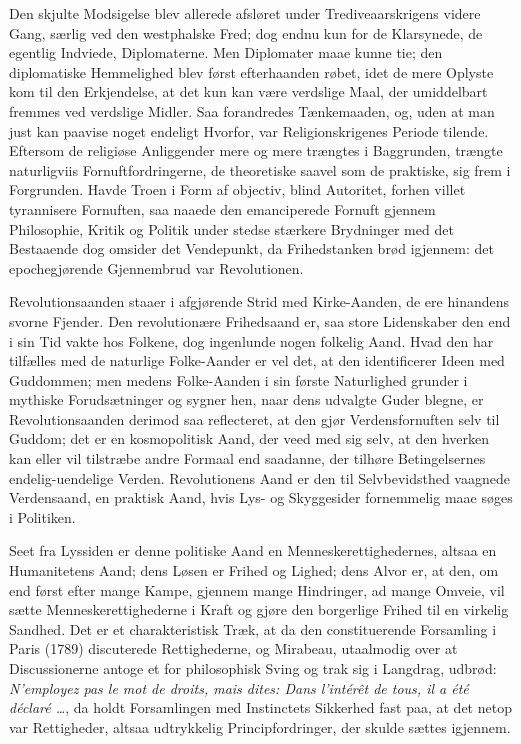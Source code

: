 \documentclass[12pt]{book}
\newcommand{\opage}[1]{\marginnote{\footnotesize\textit{[#1]}}}
\begin{document}
Den skjulte Modsigelse blev allerede afsløret under
Trediveaarskrigens videre Gang, særlig ved den westphalske
Fred; dog endnu kun for de Klarsynede, de
egentlig Indviede, Diplomaterne. Men Diplomater maae
kunne tie; den diplomatiske Hemmelighed blev først
efterhaanden røbet, idet de mere Oplyste kom til den
Erkjendelse, at det kun kan være verdslige Maal, der
umiddelbart fremmes ved verdslige Midler. Saa forandredes
Tænkemaaden, og, uden at man just kan paavise
noget endeligt Hvorfor, var Religionskrigenes Periode tilende.
Eftersom de religiøse Anliggender mere og mere
trængtes i Baggrunden, trængte naturligviis Fornuftfordringerne,
de theoretiske saavel som de praktiske, sig
frem i Forgrunden. Havde Troen i Form af objectiv,
blind Autoritet, forhen villet tyrannisere Fornuften, saa
naaede den emanciperede Fornuft gjennem Philosophie,
\opage{34}\setcounter{footnote}{0}%
Kritik og Politik under stedse stærkere Brydninger med
det Bestaaende dog omsider det Vendepunkt, da Frihedstanken
brød igjennem: det epochegjørende Gjennembrud
var Revolutionen.

Revolutionsaanden staaer i afgjørende Strid med
Kirke-Aanden, de ere hinandens svorne Fjender. Den
revolutionære Frihedsaand er, saa store Lidenskaber den
end i sin Tid vakte hos Folkene, dog ingenlunde nogen
folkelig Aand. Hvad den har tilfælles med de naturlige
Folke-Aander er vel det, at den identificerer Ideen med
Guddommen; men medens Folke-Aanden i sin første
Naturlighed grunder i mythiske Forudsætninger og sygner
hen, naar dens udvalgte Guder blegne, er Revolutionsaanden
derimod saa reflecteret, at den gjør Verdensfornuften
selv til Guddom; det er en kosmopolitisk Aand,
der veed med sig selv, at den hverken kan eller vil
tilstræbe andre Formaal end saadanne, der tilhøre Betingelsernes
endelig-uendelige Verden. Revolutionens Aand
er den til Selvbevidsthed vaagnede Verdensaand, en praktisk
Aand, hvis Lys- og Skyggesider fornemmelig maae
søges i Politiken.

Seet fra Lyssiden er denne politiske Aand en Menneskerettighedernes,
altsaa en Humanitetens Aand; dens
Løsen er Frihed og Lighed; dens Alvor er, at den, om
end først efter mange Kampe, gjennem mange Hindringer,
ad mange Omveie, vil sætte Menneskerettighederne i
Kraft og gjøre den borgerlige Frihed til en virkelig
Sandhed. Det er et charakteristisk Træk, at da den
constituerende Forsamling i Paris (1789) discuterede
Rettighederne, og Mirabeau, utaalmodig over at Discussionerne
antoge et for philosophisk Sving og trak sig i
Langdrag, udbrød: \textit{N'employez pas le mot de droits,
mais dites: Dans l'intérêt de tous, il a été déclaré \dots},
da holdt Forsamlingen med Instinctets Sikkerhed fast
\opage{35}\setcounter{footnote}{0}%
paa, at det netop var Rettigheder, altsaa udtrykkelig
Principfordringer, der skulde sættes igjennem.
\end{document}
